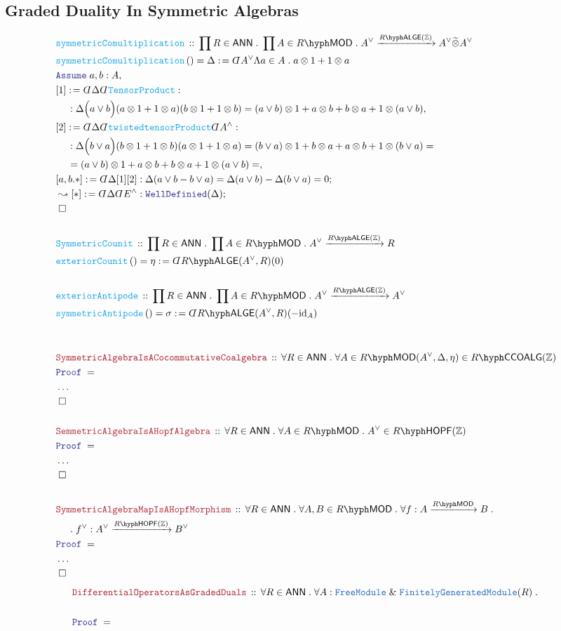 \documentclass[12pt]{scrartcl}%
\newcommand{\TYPE}[1]{\textcolor{NavyBlue}{\mathtt{#1}}}%
\newcommand{\FUNC}[1]{\textcolor{Cerulean}{\mathtt{#1}}}%
\newcommand{\LOGIC}[1]{\textcolor{Blue}{\mathtt{#1}}}%
\newcommand{\THM}[1]{\textcolor{Maroon}{\mathtt{#1}}}%
\renewcommand{\.}{\; . \;} %
\newcommand{\de}{: \kern 0.1pc =} %
\newcommand{\Act}[1]{\left( #1 \right)} %
\newcommand{\Theorem}[2]{& \THM{#1} \, :: \, #2 \\ & \Proof = \\ } %
\newcommand{\DeclareFunc}[2]{& \FUNC{#1} \, :: \, #2 \\}%
\newcommand{\DefineNamedFunc}[4]{&  \FUNC{#1}\Act{#2} = #3 \de #4 \\}%
\newcommand{\NewLine}{\\ & \kern 1pc}%
\newcommand{\Page}[1]{ \begin{align*} #1 \end{align*}  }%
\newcommand{ \bd }{ \ByDef }%
\newcommand{\NoProof}{ & \ldots \\ \EndProof}%
\renewcommand{\And}{\; \& \;}%
\newcommand{\Int}{\mathbb{Z}}%
\DeclareMathOperator*{\id}{id}%
\newcommand{\Say}[3]{& #1 \de #2 : #3, \\} %
\newcommand{\Conclude}[3]{& #1 \de #2 : #3; \\}%
\newcommand{\DeriveConclude}[3]{& \leadsto #1 \de #2 : #3 ; \\} %
\newcommand{\Assume}[2]{& \LOGIC{Assume} \; #1 : #2, \\} %
\newcommand{\QED}{\; \square} %
\newcommand{\EndProof}{& \QED \\} %
\newcommand{\ByDef}{\rotatebox[origin=c]{-180}{$D$}}%
\newcommand{\Proof}{\LOGIC{Proof} \; } %
\newcommand{\Arrow}[1]{\xrightarrow{#1}}%
\newcommand{\FGM}{\TYPE{FinitelyGeneratedModule}}%
\newcommand{\FM}{\TYPE{FreeModule}}
\newcommand{\LMOD}[1]{#1\hyph\mathsf{MOD}} %
\newcommand{\ANN}{\mathsf{ANN}} %
\newcommand{\LALGE}[1]{#1\hyph\mathsf{ALGE}}%
\newcommand{\CCOALG}[1]{#1\hyph\mathsf{CCOALG}}
\newcommand{\HOPF}[1]{#1\hyph\mathsf{HOPF}}
\begin{document}
\subsection{Graded Duality In Symmetric Algebras}
\Page{
	\DeclareFunc{symmetricComultiplication}
	{
		\prod R \in \ANN \.
		\prod A \in \LMOD{R} \.
		A^\vee \Arrow{\LALGE{R}(\Int)} A^\vee \widetilde{\otimes} A^\vee
	}
	\DefineNamedFunc{symmetricComultiplication}
	{ }{\Delta}{\bd A^\vee \Lambda a \in A \. a \otimes 1 + 1 \otimes a }
	\Assume{a,b}{A}
	\Say{[1]}{\bd \Delta \bd \FUNC{TensorProduct}}{
		\NewLine :
		\Delta\Big(a \vee b\Big)
		(a \otimes 1 + 1 \otimes a)(b \otimes 1 + 1 \otimes b) = 
		(a \vee b) \otimes 1 +  a \otimes b  + b \otimes a + 1 \otimes (a \vee b)  
	}
	\Say{[2]}{\bd \Delta \bd \FUNC{twistedtensorProduct} \bd A^\wedge}{
		\NewLine :
		\Delta\Big( b \vee a \Big) 
		(b \otimes 1 + 1 \otimes b)(a \otimes 1 + 1 \otimes a) = 
		(b \vee a) \otimes 1 +  b \otimes a  + a \otimes b + 1 \otimes (b \vee a) = \NewLine =  
	       (a \vee b) \otimes 1  +  a \otimes b  + b \otimes a + 1 \otimes (a \vee b) = 
	}
	\Conclude{[a,b.*]}{\bd \Delta[1][2]}{ \Delta(a \vee b - b \vee a) = \Delta(a \vee b) - \Delta(b \vee a) = 0} 
	\DeriveConclude{[*]}{\bd \Delta \bd E^\wedge}{\LOGIC{WellDefinied}(\Delta)}  
	\EndProof
	\\
	\DeclareFunc{SymmetricCounit}
	{
		\prod R \in \ANN \.
		\prod A \in \LMOD{R} \.
		A^\vee \Arrow{\LALGE{R}(\Int)} R
	}
	\DefineNamedFunc{exteriorCounit}{}{\eta}{\bd \LALGE{R}(A^\vee,R)(0)}
	\\
	\DeclareFunc{exteriorAntipode}
	{
		\prod R \in \ANN \.
		\prod A \in \LMOD{R} \.
		A^\vee \Arrow{\LALGE{R}(\Int)} A^\vee
	}
	\DefineNamedFunc{symmetricAntipode}{}{\sigma}{\bd \LALGE{R}(A^\vee,R)(-{\id}_A)}
	\\
	\\
	\Theorem{SymmetricAlgebraIsACocommutativeCoalgebra}
	{
		\forall R \in \ANN \.
		\forall A \in \LMOD{R}
		(A^\vee,\Delta,\eta) \in \CCOALG{R}(\Int) 
	}
	\NoProof
	\\
	\Theorem{SemmetricAlgebraIsAHopfAlgebra}
	{
		\forall R \in \ANN \.
		\forall A \in \LMOD{R} \.
		A^\vee \in \HOPF{R}(\Int)
	}
	\NoProof
	\\
	\Theorem{SymmetricAlgebraMapIsAHopfMorphism}
	{
		\forall R \in \ANN \.
		\forall A,B \in \LMOD{R} \.
		\forall f : A \Arrow{\LMOD{R}} B \. 
		\NewLine \. 
		f^\vee : A^\vee \Arrow{\HOPF{R}(\Int)} B^\vee
	}
	\NoProof
}\Page{
	\Theorem{DifferentialOperatorsAsGradedDuals}      
	{
		\forall R \in \ANN \.
		\forall A  : \FM \And \FGM(R) \. \NewLine
}}
\end{document}
